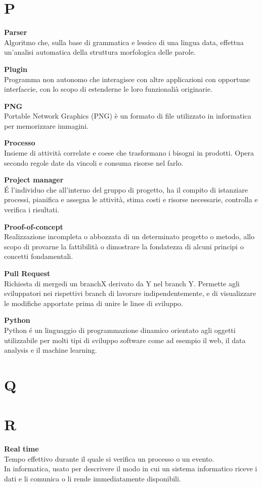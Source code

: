 \documentclass[a4paper, oneside, openany, dvipsnames, table, 12pt]{article}
\begin{document}
\newpage
\section{P}
\textbf{Parser} \\
Algoritmo che, sulla base di grammatica e lessico di una lingua data, effettua un’analisi automatica della struttura morfologica delle parole.

\textbf{Plugin} \\
Programma non autonomo che interagisce con altre applicazioni con opportune interfaccie, con lo scopo di estenderne le loro funzionalià originarie.

\textbf{PNG} \\
Portable Network Graphics (PNG) è un formato di file utilizzato in informatica per memorizzare immagini.

\textbf{Processo} \\
Insieme di attività correlate e coese che trasformano i bisogni in prodotti. Opera secondo regole date da vincoli e consuma risorse nel farlo.

\textbf{Project manager} \\
\'E l'individuo che all'interno del gruppo di progetto, ha il compito di istanziare processi, pianifica e assegna le attività, stima costi e risorse necessarie, controlla e verifica i risultati.

\textbf{Proof-of-concept} \\
Realizzazione incompleta o abbozzata di un determinato progetto o metodo, allo scopo di provarne la fattibilità o dimostrare la fondatezza di alcuni principi o concetti fondamentali.

\textbf{Pull Request} \\
Richiesta di merge\glo di un branch\glo X derivato da Y nel branch Y. Permette agli sviluppatori nei rispettivi branch di lavorare indipendentemente, e di visualizzare le modifiche apportate prima di unire le linee di sviluppo.

\textbf{Python} \\
Python \'e un linguaggio di programmazione dinamico orientato agli oggetti utilizzabile per molti tipi di sviluppo software come ad esempio il web, il data analysis e il machine learning.

\newpage
\section{Q}

\newpage
\section{R}
\textbf{Real time} \\
Tempo effettivo durante il quale si verifica un processo o un evento. \\
In informatica, usato per descrivere il modo in cui un sistema informatico riceve i dati e li comunica o li rende immediatamente disponibili.
\end{document}
